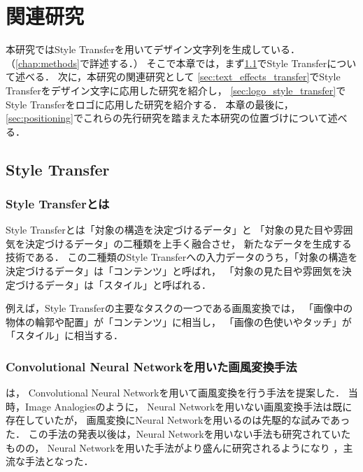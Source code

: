 \documentclass[\homedir/main.tex]{subfiles}
\begin{document}
\setcounter{chapter}{1}
\chapter{関連研究}\label{chap:related_works}
本研究ではStyle Transferを用いてデザイン文字列を生成している．（\cref{chap:methods}で詳述する．）
そこで本章では，まず\cref{sec:style_transfer}でStyle Transferについて述べる．
次に，本研究の関連研究として
\cref{sec:text_effects_transfer}でStyle Transferをデザイン文字に応用した研究を紹介し，
\cref{sec:logo_style_transfer}でStyle Transferをロゴに応用した研究を紹介する．
本章の最後に，\cref{sec:positioning}でこれらの先行研究を踏まえた本研究の位置づけについて述べる．

\section{Style Transfer}\label{sec:style_transfer}
\subsection{Style Transferとは}
Style Transferとは「対象の構造を決定づけるデータ」と
「対象の見た目や雰囲気を決定づけるデータ」の二種類を上手く融合させ，
新たなデータを生成する技術である．
この二種類のStyle Transferへの入力データのうち，「対象の構造を決定づけるデータ」は「コンテンツ」と呼ばれ，
「対象の見た目や雰囲気を決定づけるデータ」は「スタイル」と呼ばれる．

例えば，Style Transferの主要なタスクの一つである画風変換では，
「画像中の物体の輪郭や配置」が「コンテンツ」に相当し，
「画像の色使いやタッチ」が「スタイル」に相当する．

\subsection{Convolutional Neural Networkを用いた画風変換手法}
\citeauthor{Gatys_2016_CVPR}\cite{Gatys_2016_CVPR}は，
Convolutional Neural Networkを用いて画風変換を行う手法を提案した．
当時，Image Analogies\cite{10.1145/383259.383295}のように，
Neural Networkを用いない画風変換手法は既に存在していたが，
画風変換にNeural Networkを用いるのは先駆的な試みであった．
この手法の発表以後は，Neural Networkを用いない手法も研究されていた\cite{7874180}ものの，
Neural Networkを用いた手法がより盛んに研究されるようになり
\cite{10.1007/978-3-319-46475-6_43, 10.5555/3172077.3172198}，主流な手法となった．
\end{document}
